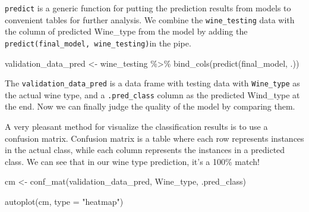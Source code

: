 \documentclass[
]{book}
\newenvironment{Shaded}{\begin{snugshade}}{\end{snugshade}}
\newcommand{\AttributeTok}[1]{\textcolor[rgb]{0.77,0.63,0.00}{#1}}
\newcommand{\FunctionTok}[1]{\textcolor[rgb]{0.00,0.00,0.00}{#1}}
\newcommand{\NormalTok}[1]{#1}
\newcommand{\OtherTok}[1]{\textcolor[rgb]{0.56,0.35,0.01}{#1}}
\newcommand{\SpecialCharTok}[1]{\textcolor[rgb]{0.00,0.00,0.00}{#1}}
\newcommand{\StringTok}[1]{\textcolor[rgb]{0.31,0.60,0.02}{#1}}
\begin{document}
\texttt{predict} is a generic function for putting the prediction results from models to convenient tables for further analysis. We combine the \texttt{wine\_testing} data with the column of predicted Wine\_type from the model by adding the \texttt{predict(final\_model,\ wine\_testing)}in the pipe.

\begin{Shaded}
\begin{Highlighting}[]
\NormalTok{validation\_data\_pred }\OtherTok{\textless{}{-}}\NormalTok{ wine\_testing }\SpecialCharTok{\%\textgreater{}\%}
  \FunctionTok{bind\_cols}\NormalTok{(}\FunctionTok{predict}\NormalTok{(final\_model, .))}
\end{Highlighting}
\end{Shaded}

The \texttt{validation\_data\_pred} is a data frame with testing data with \texttt{Wine\_type} as the actual wine type, and a \texttt{.pred\_class} column as the predicted Wind\_type at the end. Now we can finally judge the quality of the model by comparing them.

A very pleasant method for visualize the classification results is to use a confusion matrix. Confusion matrix is a table where each row represents instances in the actual class, while each column represents the instances in a predicted class. We can see that in our wine type prediction, it's a 100\% match!

\begin{Shaded}
\begin{Highlighting}[]
\NormalTok{cm }\OtherTok{\textless{}{-}} \FunctionTok{conf\_mat}\NormalTok{(validation\_data\_pred, Wine\_type, .pred\_class)}

\FunctionTok{autoplot}\NormalTok{(cm, }\AttributeTok{type =} \StringTok{"heatmap"}\NormalTok{)}
\end{Highlighting}
\end{Shaded}
\end{document}
